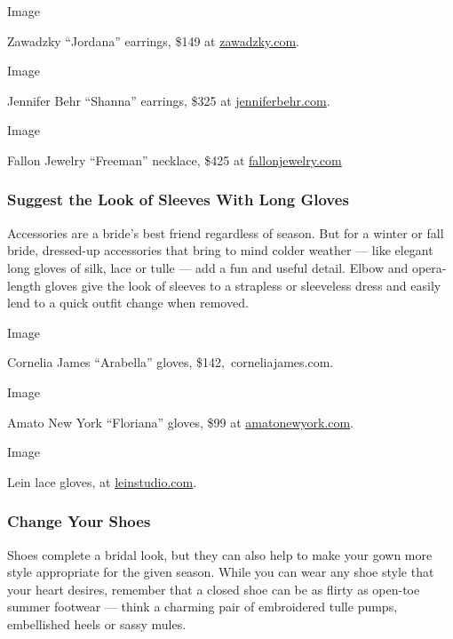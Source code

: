 Image

Zawadzky ``Jordana'' earrings, \$149 at
\href{https://www.zawadzky.com/collections/aretes-1/products/aretes-jordana-earrings?variant=31546495467590}{zawadzky.com}.

Image

Jennifer Behr ``Shanna'' earrings, \$325 at
\href{https://www.jenniferbehr.com/shanna-earring.html}{jenniferbehr.com}.

Image

Fallon Jewelry ``Freeman'' necklace, \$425 at
\href{https://fallonjewelry.com/collections/necklaces/products/freeman-bondage-collar-clear}{fallonjewelry.com}

\hypertarget{suggest-the-look-of-sleeves-with-long-gloves}{%
\subsubsection{\texorpdfstring{\textbf{Suggest the Look of Sleeves With
Long
Gloves}}{Suggest the Look of Sleeves With Long Gloves}}\label{suggest-the-look-of-sleeves-with-long-gloves}}

Accessories are a bride's best friend regardless of season. But for a
winter or fall bride, dressed-up accessories that bring to mind colder
weather --- like elegant long gloves of silk, lace or tulle --- add a
fun and useful detail. Elbow and opera-length gloves give the look of
sleeves to a strapless or sleeveless dress and easily lend to a quick
outfit change when removed.

Image

Cornelia James ``Arabella'' gloves, \$142,~corneliajames.com.

Image

Amato New York ``Floriana'' gloves, \$99 at
\href{https://www.amatonewyork.com/collections/carolina-amato/products/floriana-in-ivory}{amatonewyork.com}.

Image

Lein lace gloves, at
\href{https://leinstudio.com/collections/accessories/products/pre-order-lace-gloves}{leinstudio.com}.

\hypertarget{change-your-shoes}{%
\subsubsection{\texorpdfstring{\textbf{Change Your
Shoes}}{Change Your Shoes}}\label{change-your-shoes}}

Shoes complete a bridal look, but they can also help to make your gown
more style appropriate for the given season. While you can wear any shoe
style that your heart desires, remember that a closed shoe can be as
flirty as open-toe summer footwear --- think a charming pair of
embroidered tulle pumps, embellished heels or sassy mules.

